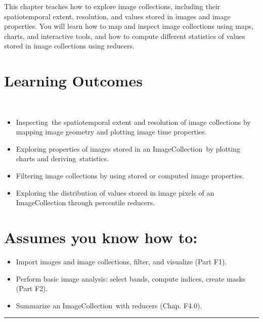 \documentclass[
  letterpaper,
  DIV=11,
  numbers=noendperiod]{scrreprt}
\providecommand{\tightlist}{%
  \setlength{\itemsep}{0pt}\setlength{\parskip}{0pt}}\usepackage{longtable,booktabs,array}
\begin{document}
This chapter teaches how to explore image collections, including their
spatiotemporal extent, resolution, and values stored in images and image
properties. You will learn how to map and inspect image collections
using maps, charts, and interactive tools, and how to compute different
statistics of values stored in image collections using reducers.

\hypertarget{learning-outcomes-8}{%
\section*{Learning Outcomes}\label{learning-outcomes-8}}


~

\begin{itemize}
\tightlist
\item
  Inspecting~the spatiotemporal extent and resolution of image
  collections by mapping image geometry and plotting image time
  properties.
\item
  Exploring properties of images stored in an ImageCollection~by
  plotting charts and deriving~statistics.
\item
  Filtering image collections by using stored or computed image
  properties.
\item
  Exploring the distribution of values stored in image pixels of an
  ImageCollection through percentile reducers.
\end{itemize}

\hypertarget{assumes-you-know-how-to-8}{%
\section*{Assumes you know how to:}\label{assumes-you-know-how-to-8}}


\begin{itemize}
\tightlist
\item
  Import images and image collections, filter, and visualize (Part F1).
\item
  Perform basic image analysis: select bands, compute indices, create
  masks (Part F2).
\item
  Summarize an ImageCollection~with reducers (Chap. F4.0).
\end{itemize}

\begin{center}\rule{0.5\linewidth}{0.5pt}\end{center}
\end{document}
